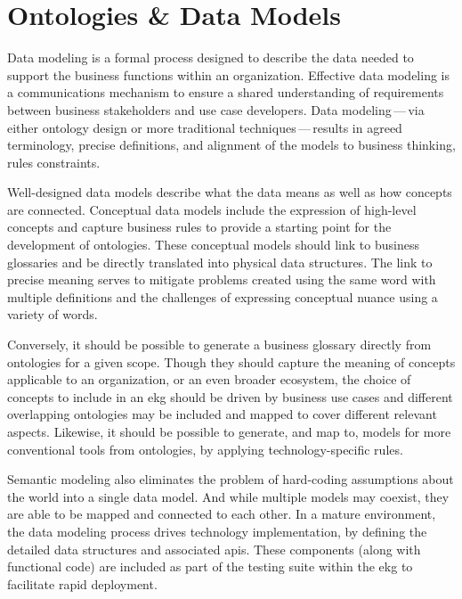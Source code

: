\section{Ontologies \& Data Models}\label{sec:ekg-mm-b-2-2} %

Data modeling is a formal process designed to describe the data needed to support the business functions within
an organization.
Effective data modeling is a communications mechanism to ensure a shared understanding of requirements between
business stakeholders and use case developers.
Data modeling\,---\,via either ontology design or more traditional techniques\,---\,results in agreed terminology,
precise definitions, and alignment of the models to business thinking, rules constraints.

\ekgmmContextSection

Well-designed data models describe what the data means as well as how concepts are connected.
Conceptual data models include the expression of high-level concepts and capture business rules to provide a starting
point for the development of ontologies.
These conceptual models should link to business glossaries and be directly translated into physical data structures.
The link to precise meaning serves to mitigate problems created using the same word with multiple definitions and
the challenges of expressing conceptual nuance using a variety of words.

Conversely, it should be possible to generate a business glossary directly from ontologies for a given scope.
Though they should capture the meaning of concepts applicable to an organization, or an even broader ecosystem,
the choice of concepts to include in an \gls{ekg} should be driven by business use cases and different
overlapping ontologies may be included and mapped to cover different relevant aspects.
Likewise, it should be possible to generate, and map to, models for more conventional tools from ontologies,
by applying technology-specific rules.

Semantic modeling also eliminates the problem of hard-coding assumptions about the world into a single data model.
And while multiple models may coexist, they are able to be mapped and connected to each other.
In a mature environment, the data modeling process drives technology implementation,
by defining the detailed data structures and associated \glspl{api}.
These components (along with functional code) are included as part of the testing suite within the \gls{ekg}
to facilitate rapid deployment.

